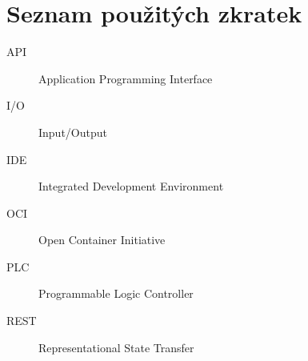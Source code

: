 \chapter{Seznam použitých zkratek}
\begin{description}
	\item[API] Application Programming Interface
	\item[I/O] Input/Output
	\item[IDE] Integrated Development Environment 
	\item[OCI] Open Container Initiative
	\item[PLC] Programmable Logic Controller
	\item[REST] Representational State Transfer
\end{description}